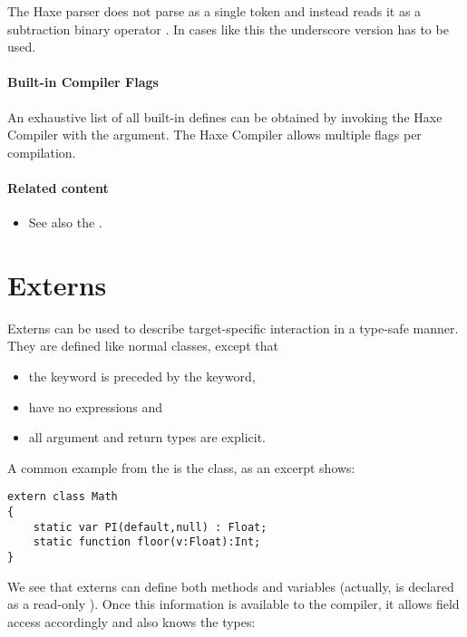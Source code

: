 The Haxe parser does not parse  as a single token and instead reads it as a subtraction binary operator . In cases like this the underscore version  has to be used.


\paragraph{Built-in Compiler Flags}
An exhaustive list of all built-in defines can be obtained by invoking the Haxe Compiler with the  argument. The Haxe Compiler allows multiple  flags per compilation.


\paragraph{Related content}
\begin{itemize}
	\item See also the .
\end{itemize} 


\section{Externs}
\label{lf-externs}

Externs can be used to describe target-specific interaction in a type-safe manner. They are defined like normal classes, except that

\begin{itemize}
	\item the  keyword is preceded by the  keyword,
	\item {} have no expressions and
	\item all argument and return types are explicit.
\end{itemize}

A common example from the  is the  class, as an excerpt shows:

\begin{lstlisting}
extern class Math
{
	static var PI(default,null) : Float;
	static function floor(v:Float):Int;
}
\end{lstlisting}

We see that externs can define both methods and variables (actually,  is declared as a read-only ). Once this information is available to the compiler, it allows field access accordingly and also knows the types:

